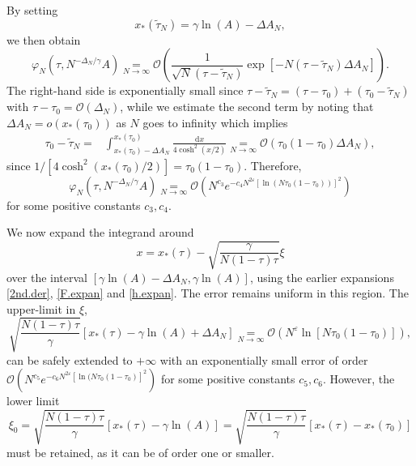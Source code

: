\documentclass[pdflatex,sn-mathphys-num]{sn-jnl}
\theoremstyle{thmstyleone}
\numberwithin{equation}{section}
\begin{document}
By setting
\begin{equation}
x_*(\widetilde\tau_N)=\gamma\ln(A)-\Delta A_N,
\end{equation}
we then obtain
\begin{equation}
\varphi_N(\tau,N^{-\Delta_N/\gamma}A)\underset{N\to\infty}{=}\mathcal{O}\left(\frac{1}{\sqrt{N}(\tau-\widetilde\tau_N)}\exp\left[-N(\tau-\widetilde\tau_N)\Delta A_N\right]\right).
\end{equation}
The right-hand side is exponentially small since $\tau-\widetilde\tau_N=(\tau-\tau_0)+(\tau_0-\widetilde\tau_N)$ with $\tau-\tau_{0}=\mathcal{O}(\Delta_N)$, while we estimate the second term by noting that $\Delta A_N=o(x_*(\tau_0))$ as $N$ goes to infinity which implies
\begin{equation}
\begin{split}
\tau_0-\widetilde\tau_N=&\int_{x_*(\tau_0)-\Delta A_N}^{x_*(\tau_0)}\frac{\mathrm{d}x}{4\cosh^2(x/2)}\underset{N\to\infty}{=}\mathcal{O}(\tau_0(1-\tau_0)\Delta A_N),
\end{split}
\end{equation}
since $1/[4\cosh^2(x_*(\tau_0)/2)]=\tau_0(1-\tau_0)$. Therefore, 
\begin{equation}
\varphi_N(\tau,N^{-\Delta_N/\gamma}A)\underset{N\to\infty}{=}\mathcal{O}(N^{c_{3}}e^{-c_{4} N^{2\varepsilon}[\ln(N\tau_0(1-\tau_0))]^2})
\end{equation}
for some positive constants $c_{3},c_{4}$.



We now expand the integrand around
\begin{equation}
    x=x_*(\tau)-\sqrt{\frac{\gamma}{N(1-\tau)\tau}}\xi
\end{equation}
over the interval $[\gamma\ln(A)-\Delta A_N,\gamma\ln(A)]$, using the earlier expansions \eqref{2nd.der}, \eqref{F.expan} and \eqref{h.expan}. The error remains uniform in this region.
The upper-limit in $\xi$,
\begin{equation}
    \sqrt{\frac{N(1-\tau)\tau}{\gamma}}[x_*(\tau)-\gamma\ln(A)+\Delta A_N]\underset{N\to\infty}{=} \mathcal{O}(N^\varepsilon\ln[N\tau_0(1-\tau_0)]),
\end{equation}
can be safely extended to $+\infty$ with an exponentially small error of order $\mathcal{O}(N^{c_{5}}e^{-c_{6}N^{2\varepsilon}[\ln(N\tau_0(1-\tau_0)]^2})$ for some positive constants $c_{5},c_{6}$.
However, the lower limit
\begin{equation}\label{lower.term}
   \xi_0=\sqrt{\frac{N(1-\tau)\tau}{\gamma}}[x_*(\tau)-\gamma\ln(A)]=\sqrt{\frac{N(1-\tau)\tau}{\gamma}}[x_*(\tau)-x_*(\tau_0)]
\end{equation}
must be retained, as it can be of order one or smaller.
\end{document}
